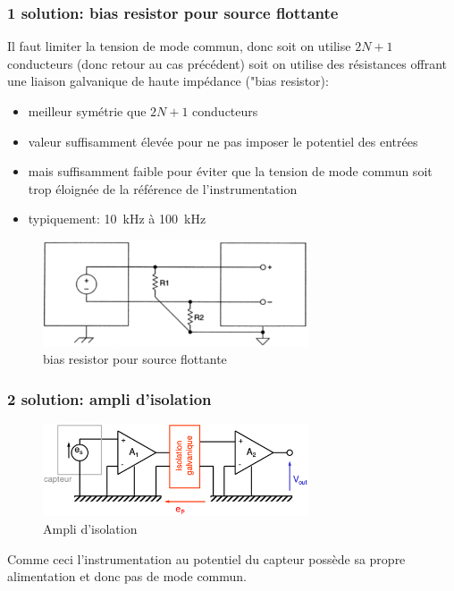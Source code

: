 \subsubsection{1 solution: bias resistor pour source flottante}
Il faut limiter la tension de mode commun, donc soit on utilise \(2N+1\) conducteurs (donc retour au cas précédent) soit on utilise des résistances offrant une liaison galvanique de haute impédance ("bias resistor):
\begin{itemize}
	\item meilleur symétrie que \(2N+1\) conducteurs
	\item valeur suffisamment élevée pour ne pas imposer le potentiel des entrées
	\item mais suffisamment faible pour éviter que la tension de mode commun soit trop éloignée de la référence de l’instrumentation
	\item typiquement: \SI{10}{\kilo\hertz} à \SI{100}{\kilo\hertz}
\end{itemize}
\begin{figure}[H] 
	\centering 
	\includegraphics[width=0.7\textwidth,height=10\baselineskip,keepaspectratio]{ch3/image21} 
	\caption{bias resistor pour source flottante} 
\end{figure}
\subsubsection{2 solution: ampli d'isolation}
\begin{figure}[H] 
	\centering 
	\includegraphics[width=0.7\textwidth,height=10\baselineskip,keepaspectratio]{ch3/image22} 
	\caption{Ampli d'isolation} 
\end{figure}
Comme ceci l'instrumentation au potentiel du capteur possède sa propre alimentation et donc pas de mode commun.

